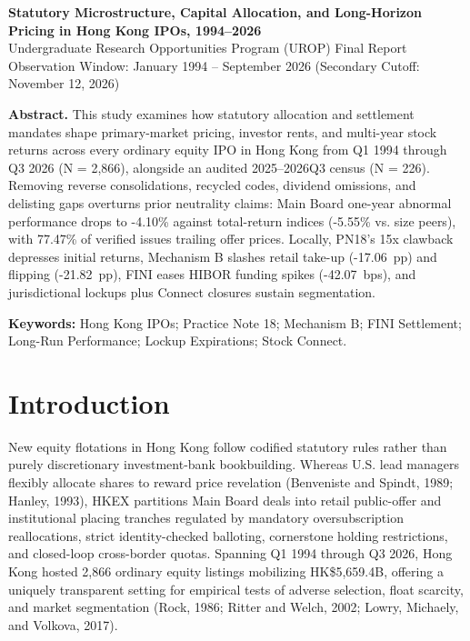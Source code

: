 \documentclass[12pt,letterpaper]{article}
\begin{document}
\begin{center}
{\fontsize{14}{17}\selectfont\bfseries Statutory Microstructure, Capital Allocation, and Long-Horizon Pricing in Hong Kong IPOs, 1994--2026}\\[4pt]
{\normalsize Undergraduate Research Opportunities Program (UROP) Final Report}\\[1pt]
{\small Observation Window: January 1994 -- September 2026 (Secondary Cutoff: November 12, 2026)}
\end{center}

\vspace{2pt}
\noindent\textbf{Abstract.} This study examines how statutory allocation and settlement mandates shape primary-market pricing, investor rents, and multi-year stock returns across every ordinary equity IPO in Hong Kong from Q1 1994 through Q3 2026 (N = 2,866), alongside an audited 2025--2026Q3 census (N = 226). Removing reverse consolidations, recycled codes, dividend omissions, and delisting gaps overturns prior neutrality claims: Main Board one-year abnormal performance drops to \mbox{-4.10\%} against total-return indices (\mbox{-5.55\%} vs. size peers), with 77.47\% of verified issues trailing offer prices. Locally, PN18's 15x clawback depresses initial returns, Mechanism B slashes retail take-up (\mbox{-17.06 pp}) and flipping (\mbox{-21.82 pp}), FINI eases HIBOR funding spikes (\mbox{-42.07 bps}), and jurisdictional lockups plus Connect closures sustain segmentation.

\vspace{2pt}
\noindent\textbf{Keywords:} Hong Kong IPOs; Practice Note 18; Mechanism B; FINI Settlement; Long-Run Performance; Lockup Expirations; Stock Connect.

\section{Introduction}

New equity flotations in Hong Kong follow codified statutory rules rather than purely discretionary investment-bank bookbuilding. Whereas U.S. lead managers flexibly allocate shares to reward price revelation (Benveniste and Spindt, 1989; Hanley, 1993), HKEX partitions Main Board deals into retail public-offer and institutional placing tranches regulated by mandatory oversubscription reallocations, strict identity-checked balloting, cornerstone holding restrictions, and closed-loop cross-border quotas. Spanning Q1 1994 through Q3 2026, Hong Kong hosted 2,866 ordinary equity listings mobilizing HK\$5,659.4B, offering a uniquely transparent setting for empirical tests of adverse selection, float scarcity, and market segmentation (Rock, 1986; Ritter and Welch, 2002; Lowry, Michaely, and Volkova, 2017).
\end{document}
